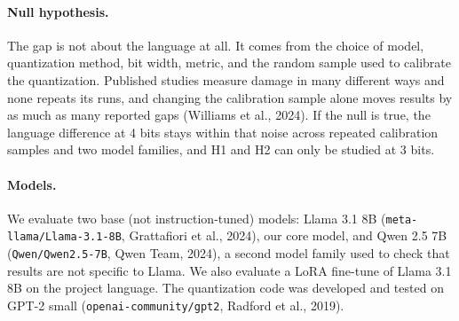 \documentclass[11pt]{article}
\begin{document}
\paragraph{Null hypothesis.} The gap is not about the language at all. It comes from the choice of model, quantization method, bit width, metric, and the random sample used to calibrate the quantization. Published studies measure damage in many different ways and none repeats its runs, and changing the calibration sample alone moves results by as much as many reported gaps (Williams et al., 2024). If the null is true, the language difference at 4 bits stays within that noise across repeated calibration samples and two model families, and H1 and H2 can only be studied at 3 bits.

\paragraph{Models.} We evaluate two base (not instruction-tuned) models: Llama 3.1 8B (\nolinkurl{meta-llama/Llama-3.1-8B}, Grattafiori et al., 2024), our core model, and Qwen 2.5 7B (\nolinkurl{Qwen/Qwen2.5-7B}, Qwen Team, 2024), a second model family used to check that results are not specific to Llama. We also evaluate a LoRA fine-tune of Llama 3.1 8B on the project language. The quantization code was developed and tested on GPT-2 small (\nolinkurl{openai-community/gpt2}, Radford et al., 2019).
\end{document}
